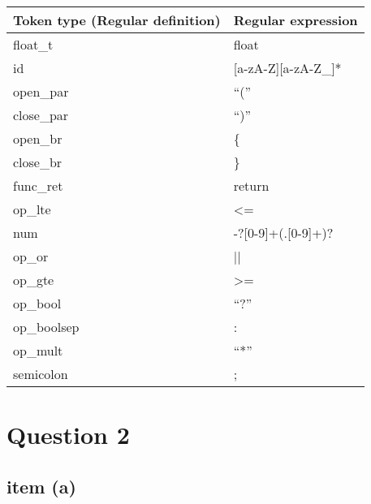 \documentclass[10pt]{article}
\begin{document}
\begin{table}[H]
\centering
\begin{tabular}{ll}
\bfseries  Token type (Regular definition)  & \bfseries  Regular expression               \\
\hline
 float\_t     &  float               \\
 id          &  [a-zA-Z][a-zA-Z\_]*  \\
 open\_par      &  ``(''               \\
 close\_par     &  ``)''               \\
 open\_br      &  \{                  \\
 close\_br     &  \}                  \\
 func\_ret    &  return              \\
 op\_lte      &  <=                  \\
 num         &  -?[0-9]+(.[0-9]+)?  \\
 op\_or       &  ||           \\
 op\_gte      &  >=                  \\
 op\_bool     &  ``?''               \\
 op\_boolsep  &  :                   \\
 op\_mult     &  ``*''               \\
 semicolon   &  ;                   \\
\end{tabular}
\end{table}


\section*{Question 2}
\subsection*{item (a)}
\end{document}
